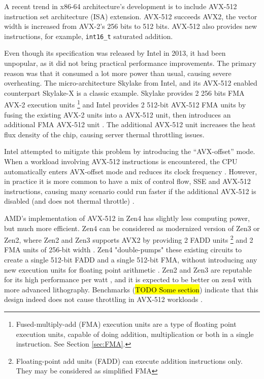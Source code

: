 \documentclass[logo,bsc,singlespacing,parskip]{infthesis}
\begin{document}
A recent trend in x86-64 architecture’s development is to include AVX-512
instruction set architecture (ISA) extension. AVX-512 succeeds AVX2, the vector
width is increased from AVX-2’s 256 bits to 512 bits. AVX-512 also provides new
instructions, for example, \texttt{int16\_t} saturated addition.


Even though its specification was released by Intel in 2013, it had been
unpopular, as it did not bring practical performance improvements. The primary
reason was that it consumed a lot more power than usual, causing severe
overheating. The micro-architecture Skylake from Intel, and its AVX-512 enabled
counterpart Skylake-X is a classic example. Skylake provides 2 256 bits FMA
AVX-2 execution units 
\footnote{Fused-multiply-add (FMA) execution units are a type of
floating point execution units, capable of doing addition, multiplication or
both in a single instruction. See Section \ref{sec:FMA}.} 
and Intel provides 2 512-bit AVX-512 FMA units by
fusing the existing AVX-2 units into a AVX-512 unit, then introduces an
additional FMA AVX-512 unit \cite{SLK-X}. The additional AVX-512 unit increases
the heat flux density of the chip, causing server thermal throttling issues. 

Intel attempted to mitigate this problem by introducing the ``AVX-offset'' mode.
When a workload involving AVX-512 instructions is encountered, the CPU
automatically enters AVX-offset mode and reduces its clock frequency
\cite{AVX-offset}. However, in practice it is more common to have a mix of
control flow, SSE and AVX-512 instructions, causing many scenario could run
faster if the additional AVX-512 is disabled (and does not thermal throttle)
\cite{Zen4Critique}.

AMD’s implementation of AVX-512 in Zen4 has slightly less computing power, but
much more efficient. Zen4 can be considered as modernized version of Zen3 or
Zen2, where Zen2 and Zen3 supports AVX2 by providing 2 FADD units
\footnote{Floating-point add units (FADD) can execute addition instructions
only. They may be considered as simplified FMA} and 2 FMA units of 256-bit width
\cite{Zen2ChipWiki}. Zen4 "double-pumps" these existing circuits to create a
single 512-bit FADD and a single 512-bit FMA, without introducing any new
execution units for floating point arithmetic \cite{Zen4Critique}. Zen2 and Zen3
are reputable for its high performance per watt \cite{ZenPerfPerWatt}, and it is
expected to be better on zen4 with more advanced lithography. Benchmarks
(\hl{TODO Some section}) indicate that this design indeed does not cause
throttling in AVX-512 workloads \cite{Zen4Critique}.
\end{document}
